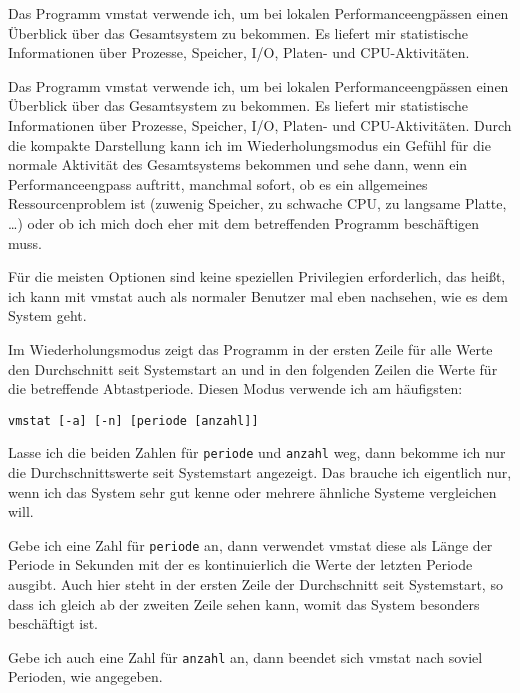 \begin{abstractsec}
  Das Programm vmstat verwende ich, um bei lokalen Performanceengpässen einen
  Überblick über das Gesamtsystem zu bekommen. Es liefert mir statistische
  Informationen über Prozesse, Speicher, I/O, Platen- und CPU-Aktivitäten.
\end{abstractsec}
\begin{normaltext}
  Das Programm vmstat verwende ich, um bei lokalen Performanceengpässen einen
  Überblick über das Gesamtsystem zu bekommen. Es liefert mir statistische
  Informationen über Prozesse, Speicher, I/O, Platen- und CPU-Aktivitäten.
  Durch die kompakte Darstellung kann ich im Wiederholungsmodus  ein Gefühl
  für die normale Aktivität des Gesamtsystems bekommen und sehe dann, wenn ein
  Performanceengpass auftritt, manchmal sofort, ob es ein allgemeines
  Ressourcenproblem ist (zuwenig Speicher, zu schwache CPU, zu langsame
  Platte, \ldots) oder ob ich mich doch eher mit dem betreffenden Programm
  beschäftigen muss.

  Für die meisten Optionen sind keine speziellen Privilegien erforderlich, das
  heißt, ich kann mit vmstat auch als normaler Benutzer mal eben nachsehen,
  wie es dem System geht.
  
  Im Wiederholungsmodus zeigt das Programm in der ersten Zeile für alle Werte
  den Durchschnitt seit Systemstart an und in den folgenden Zeilen die Werte
  für die betreffende Abtastperiode. Diesen Modus verwende ich am häufigsten:
  \begin{verbatim}
vmstat [-a] [-n] [periode [anzahl]]
  \end{verbatim}
  Lasse ich die beiden Zahlen für \verb?periode? und \verb?anzahl? weg, dann
  bekomme ich nur die Durchschnittswerte seit Systemstart angezeigt. Das
  brauche ich eigentlich nur, wenn ich das System sehr gut kenne oder mehrere
  ähnliche Systeme vergleichen will.

  Gebe ich eine Zahl für \verb?periode? an, dann verwendet vmstat diese als Länge der
  Periode in Sekunden mit der es kontinuierlich die Werte der letzten Periode
  ausgibt. Auch hier steht in der ersten Zeile der Durchschnitt seit
  Systemstart, so dass ich gleich ab der zweiten Zeile sehen kann, womit das
  System besonders beschäftigt ist.

  Gebe ich auch eine Zahl für \verb?anzahl? an, dann beendet sich vmstat nach
  soviel Perioden, wie angegeben.


\end{normaltext}
